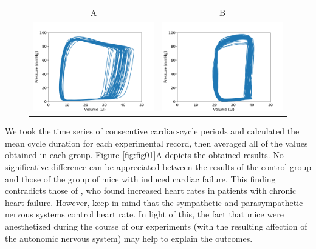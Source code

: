 \documentclass[%
preprint,
 amsmath,amssymb,
 aps,
]{revtex4-2}
\begin{document}
\begin{figure}[h!]
    \begin{tabular}{cc}
        A & B \\
        \includegraphics[width=3in]{PVLoops_A.pdf} &
        \includegraphics[width=3in]{PVLoops_B.pdf}
    \end{tabular}
    \caption{}
    \label{fig:PVLoops}
\end{figure}

We took the time series of consecutive cardiac-cycle periods and calculated the mean cycle duration for each experimental record, then averaged all of the values obtained in each group. Figure \ref{fig:fig01}A depicts the obtained results. No significative difference can be appreciated between the results of the control group and those of the group of mice with induced cardiac failure. This finding contradicts those of \citet{Kamen_1995}, who found increased heart rates in patients with chronic heart failure. However, keep in mind that the sympathetic and parasympathetic nervous systems control heart rate. In light of this, the fact that mice were anesthetized during the course of our experiments (with the resulting affection of the autonomic nervous system) may help to explain the outcomes.
\end{document}
